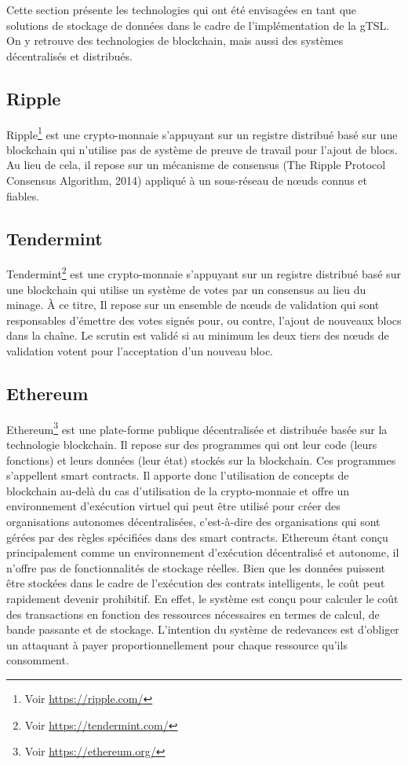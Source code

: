 \documentclass{tnreport}
\begin{document}
Cette section présente les technologies qui ont été envisagées en tant que solutions de stockage de données dans le cadre de l'implémentation de la gTSL. On y retrouve des technologies de blockchain, mais aussi des systèmes décentralisés et distribués.

\subsection{Ripple}

Ripple\footnote{Voir \url{https://ripple.com/}} est une crypto-monnaie s'appuyant sur un registre distribué basé sur une blockchain qui n'utilise pas de système de preuve de travail pour l'ajout de blocs. Au lieu de cela, il repose sur un mécanisme de consensus (The Ripple Protocol Consensus Algorithm, 2014) appliqué à un sous-réseau de nœuds connus et fiables.

\subsection{Tendermint}

Tendermint\footnote{Voir \url{https://tendermint.com/}} est une crypto-monnaie s'appuyant sur un registre distribué basé sur une blockchain qui utilise un système de votes par un consensus au lieu du minage. À ce titre, Il repose sur un ensemble de nœuds de validation qui sont responsables d'émettre des votes signés pour, ou contre, l'ajout de nouveaux blocs dans la chaîne. Le scrutin est validé si au minimum les deux tiers des nœuds de validation votent pour l'acceptation d'un nouveau bloc.

\subsection{Ethereum}

Ethereum\footnote{Voir \url{https://ethereum.org/}} est une plate-forme publique décentralisée et distribuée basée sur la technologie blockchain. Il repose sur des programmes qui ont leur code (leurs fonctions) et leurs données (leur état) stockés sur la blockchain. Ces programmes s'appellent smart contracts. 
Il apporte donc l'utilisation de concepts de blockchain au-delà du cas d'utilisation de la crypto-monnaie et offre un environnement d'exécution virtuel qui peut être utilisé pour créer des organisations autonomes décentralisées, c'est-à-dire des organisations qui sont gérées par des règles spécifiées dans des smart contracts. Ethereum étant conçu principalement comme un environnement d'exécution décentralisé et autonome, il n'offre pas de fonctionnalités de stockage réelles. Bien que les données puissent être stockées dans le cadre de l'exécution des contrats intelligents, le coût peut rapidement devenir prohibitif. En effet, le système est conçu pour calculer le coût des transactions en fonction des ressources nécessaires en termes de calcul, de bande passante et de stockage. L'intention du système de redevances est d'obliger un attaquant à payer proportionnellement pour chaque ressource qu'ils consomment.
\end{document}
